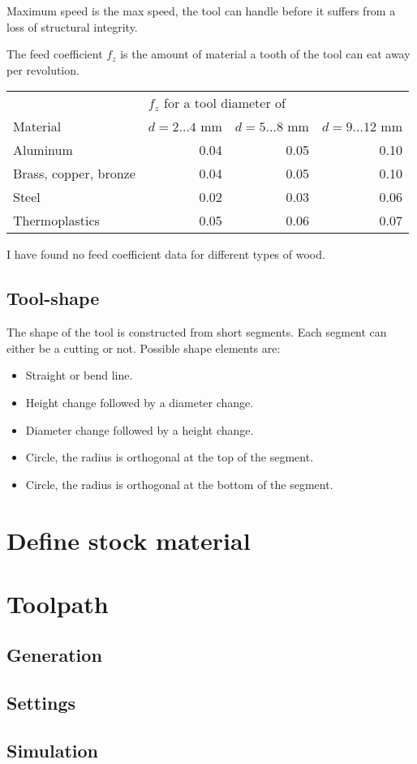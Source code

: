 Maximum speed is the max speed, the tool can handle  before it suffers
from a loss of structural integrity.

The feed coefficient $f_z$ is the amount of material a tooth of the tool
can eat away per revolution. 

\begin{table}[htb]
\begin{tabular}{|l|r|r|r|}
\hline
&\multicolumn{3}{|l|}{$f_z$ for a tool diameter of}\\
Material&$d=2\ldots4$ mm&$d=5\ldots8$ mm&$d=9\ldots12$ mm\\
\hline
Aluminum&0.04&0.05&0.10\\
Brass, copper, bronze&0.04&0.05&0.10\\
Steel&0.02&0.03&0.06\\
Thermoplastics&0.05&0.06&0.07\\
\hline
\end{tabular}
\end{table}


I have found no feed coefficient data for different types of wood.

\subsection{Tool-shape}

The shape of the tool is constructed from short segments.
Each segment can either be a cutting or not.
Possible shape elements are:

\begin{itemize}
\item Straight or bend line.
\item Height change followed by a diameter change.
\item Diameter change followed by a height change.
\item Circle, the radius is orthogonal at the top of the segment.
\item Circle, the radius is orthogonal at the bottom of the segment.
\end{itemize}

\section{Define stock material}

\section{Toolpath}

\subsection{Generation}

\subsection{Settings}

\subsection{Simulation}
